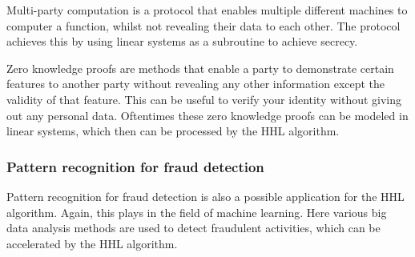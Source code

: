     Multi-party computation is a protocol that enables multiple different machines to computer a function, whilst not revealing their data to each other. 
    The protocol achieves this by using linear systems as a subroutine to achieve secrecy.

    Zero knowledge proofs are methods that enable a party to demonstrate certain features to another party without revealing any other information except the validity of that feature.
    This can be useful to verify your identity without giving out any personal data.
    Oftentimes these zero knowledge proofs can be modeled in linear systems, which then can be processed by the HHL algorithm.

    \subsubsection{Pattern recognition for fraud detection}
    Pattern recognition for fraud detection is also a possible application for the HHL algorithm.
    Again, this plays in the field of machine learning. 
    Here various big data analysis methods are used to detect fraudulent activities, which can be accelerated by the HHL algorithm.







